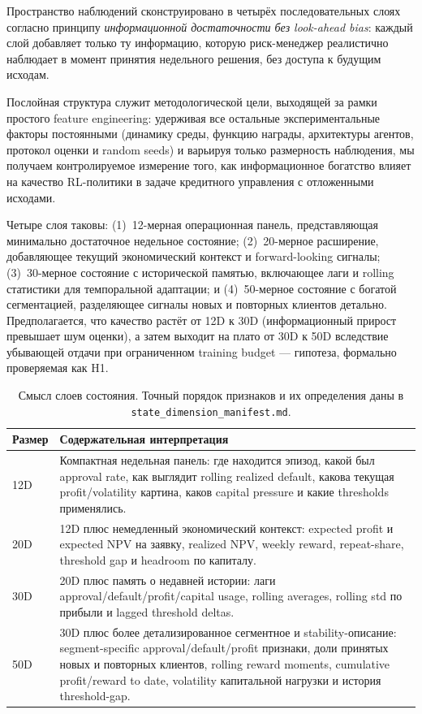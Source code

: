 \documentclass[12pt,a4paper]{article}
\begin{document}
Пространство наблюдений сконструировано в четырёх последовательных слоях
согласно принципу \textit{информационной достаточности без look-ahead bias}:
каждый слой добавляет только ту информацию, которую риск-менеджер
реалистично наблюдает в момент принятия недельного решения, без доступа
к будущим исходам.

Послойная структура служит методологической цели, выходящей за рамки
простого feature engineering: удерживая все остальные экспериментальные
факторы постоянными (динамику среды, функцию награды, архитектуры агентов,
протокол оценки и random seeds) и варьируя только размерность наблюдения,
мы получаем контролируемое измерение того, как информационное богатство
влияет на качество RL-политики в задаче кредитного управления с отложенными
исходами.

Четыре слоя таковы: (1)~12-мерная операционная панель, представляющая
минимально достаточное недельное состояние; (2)~20-мерное расширение,
добавляющее текущий экономический контекст и forward-looking сигналы;
(3)~30-мерное состояние с исторической памятью, включающее лаги и rolling
статистики для темпоральной адаптации; и (4)~50-мерное состояние с богатой
сегментацией, разделяющее сигналы новых и повторных клиентов детально.
Предполагается, что качество растёт от 12D к 30D (информационный прирост
превышает шум оценки), а затем выходит на плато от 30D к 50D вследствие
убывающей отдачи при ограниченном training budget --- гипотеза, формально
проверяемая как H1.

\begin{table}[H]
    \centering
    \small
    \begin{tabularx}{0.98\textwidth}{p{}X}
        \toprule
        Размер & Содержательная интерпретация \\
        \midrule
        12D & Компактная недельная панель: где находится эпизод, какой был approval rate, как выглядит rolling realized default, какова текущая profit/volatility картина, каков capital pressure и какие thresholds применялись. \\
        20D & 12D плюс немедленный экономический контекст: expected profit и expected NPV на заявку, realized NPV, weekly reward, repeat-share, threshold gap и headroom по капиталу. \\
        30D & 20D плюс память о недавней истории: лаги approval/default/profit/capital usage, rolling averages, rolling std по прибыли и lagged threshold deltas. \\
        50D & 30D плюс более детализированное сегментное и stability-описание: segment-specific approval/default/profit признаки, доли принятых новых и повторных клиентов, rolling reward moments, cumulative profit/reward to date, volatility капитальной нагрузки и история threshold-gap. \\
        \bottomrule
    \end{tabularx}
    \caption{Смысл слоев состояния. Точный порядок признаков и их определения даны в \texttt{state\_dimension\_manifest.md}.}
    \label{tab:ru-features}
\end{table}
\end{document}
